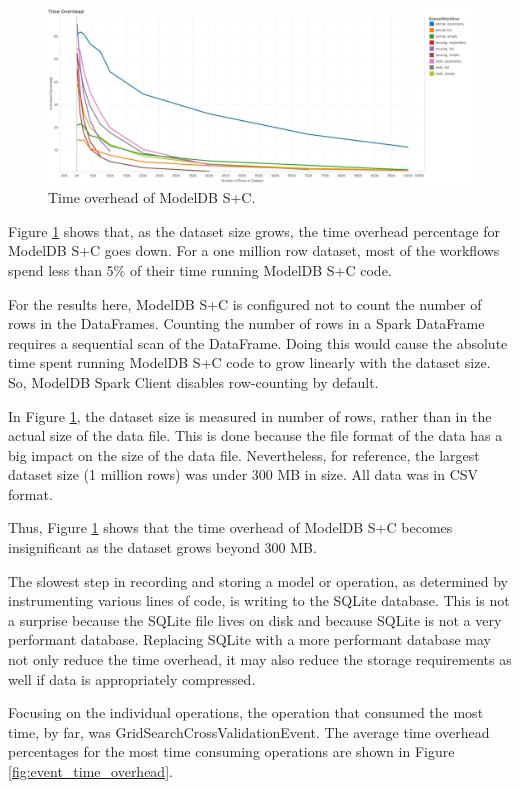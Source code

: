 \begin{figure}
  \centering
  \includegraphics[width=6.0in]{time_overhead}
  \caption{
    Time overhead of ModelDB S+C.
  }
  \label{fig:time_overhead}
\end{figure}

Figure \ref{fig:time_overhead} shows that, as the dataset size grows, the time overhead
percentage for ModelDB S+C goes down. For a one million row dataset,
most of the workflows spend less than 5\% of their time running ModelDB S+C code.

For the results here, ModelDB S+C is configured not to count the number of rows in the DataFrames.
Counting the number of rows in a Spark DataFrame requires a sequential scan of the DataFrame. Doing this
would cause the absolute time spent running ModelDB S+C code to grow linearly with the dataset size. So, ModelDB Spark
Client disables row-counting by default.

In Figure \ref{fig:time_overhead}, the dataset size is measured in number of rows, rather than in
the actual size of the data file. This is done because the file format of the data has a big impact on
the size of the data file. Nevertheless, for reference, the largest dataset size (1 million rows) was under 300 MB
in size. All data was in CSV format.

Thus, Figure \ref{fig:time_overhead} shows that the time overhead of ModelDB S+C becomes insignificant 
as the dataset grows beyond 300 MB. 

The slowest step in recording and storing a model or operation, as determined by 
instrumenting various lines of code, is writing to the SQLite database. This is not a surprise
because the SQLite file lives on disk and because SQLite is not a very performant database.
Replacing SQLite with a more performant database may not only reduce the time overhead, it may
also reduce the storage requirements as well if data is appropriately compressed.

Focusing on the individual operations, the operation that consumed the most time, by far, was
GridSearchCrossValidationEvent. The average time overhead percentages for the most time
consuming operations are shown in Figure \ref{fig:event_time_overhead}.

